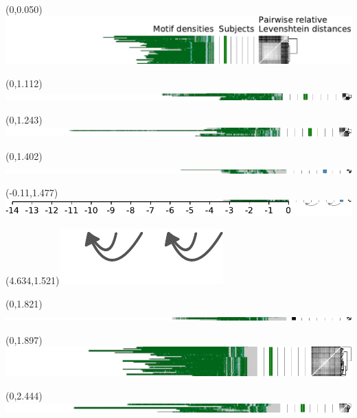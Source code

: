 \documentclass{article}
\begin{document}
\begin{textblock}{13}(0,0.050)\includegraphics{./Figure_S4/chr2-HG002.pdf}\end{textblock}
\begin{textblock}{13}(0,1.112)\includegraphics{./Figure_S4/chr2-HG003.pdf}\end{textblock}
\begin{textblock}{13}(0,1.243)\includegraphics{./Figure_S4/chr2-HG004.pdf}\end{textblock}
\begin{textblock}{13}(0,1.402)\includegraphics{./Figure_S4/chr2-HG005.pdf}\end{textblock}
\begin{textblock}{13}(-0.11,1.477)\includegraphics{./Figure_S4/chr2-HG007.pdf}\end{textblock}
\begin{textblock}{13}(4.634,1.521)\includegraphics[width=.78in,keepaspectratio]{Figure_4/fatter-arrows.pdf}\end{textblock}
\begin{textblock}{13}(0,1.821)\includegraphics{./Figure_S4/3ptel_1-500K_1_12_12-HG001.pdf}\end{textblock}
\begin{textblock}{13}(0,1.897)\includegraphics{./Figure_S4/3ptel_1-500K_1_12_12-HG002.pdf}\end{textblock}
\begin{textblock}{13}(0,2.444)\includegraphics{./Figure_S4/3ptel_1-500K_1_12_12-HG003.pdf}\end{textblock}
\end{document}
